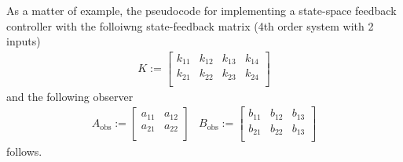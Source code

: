 \documentclass[12pt]{Template_}
\begin{document}
As a matter of example, the pseudocode for implementing a state-space feedback controller with the folloiwng state-feedback matrix (4th order system with 2 inputs)
\[
\begin{array}{cccc}
 K:=\left[ \begin{array}{cccc}
 k_{11} & k_{12} & k_{13} & k_{14}\\
 k_{21} & k_{22} & k_{23} & k_{24}\\
 \end{array}
 \right]
 \end{array}
\]
and the following observer
\[
\begin{array}{cccc}
 A_\mathrm{obs}:=\left[ \begin{array}{cc}
 a_{11} & a_{12}\\
 a_{21} & a_{22}\\
 \end{array}
 \right] &
 B_\mathrm{obs}:=\left[ \begin{array}{ccc}
 b_{11} & b_{12} & b_{13}\\
 b_{21} & b_{22} & b_{13}\\
 \end{array}
 \right]
 \end{array}
\]
follows.
\end{document}
